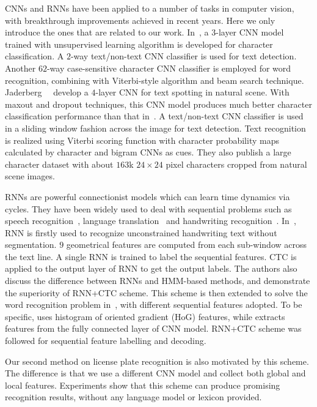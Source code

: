 \documentclass[twocolumn]{svjour3}
\begin{document}
CNNs and RNNs have been applied to a number of tasks in computer vision, with breakthrough improvements achieved in recent years. Here we only introduce the ones that are related to our work. In~\cite{Wang2012}, a $3$-layer CNN model trained with unsupervised learning algorithm is developed for character classification. A $2$-way text/non-text CNN classifier is used for text detection. Another $62$-way case-sensitive character CNN classifier is employed for word recognition, combining with Viterbi-style algorithm and beam search technique.  Jaderberg~\etal~\cite{Max2014ECCV} develop a $4$-layer CNN for text spotting in natural scene. With maxout and dropout techniques, this CNN model produces much better character classification performance than that in~\cite{Wang2012}. A text/non-text CNN classifier is used in a sliding window fashion across the image for text detection. Text recognition is realized using Viterbi scoring function with character probability maps calculated by character and bigram CNNs as cues. They also publish a large character dataset with about $163$k $24 \times 24$ pixel characters cropped from natural scene images.

RNNs are powerful connectionist models which can learn time dynamics via cycles. They have been widely used to deal with sequential problems such as speech recognition~\cite{Graves2006ICML}, language translation~\cite{Sutskever2014} and handwriting recognition~\cite{Graves2009Pami}. In~\cite{Graves2009Pami}, RNN is firstly used to recognize unconstrained handwriting text without segmentation. $9$ geometrical features are computed from each sub-window across the text line. A single RNN is trained to label the sequential features. CTC is applied to the output layer of RNN to get the output labels. The authors also discuss the difference between RNNs and HMM-based methods, and demonstrate the superiority of RNN+CTC scheme. This scheme is then extended to solve the word recognition problem in~\cite{Su2014ACCV,He2015Reading}, with different sequential features adopted. To be specific, \cite{Su2014ACCV} uses histogram of oriented gradient (HoG) features, while \cite{He2015Reading} extracts features from the fully connected layer of CNN model. RNN+CTC scheme was followed for sequential feature labelling and decoding.

Our second method on license plate recognition is also motivated by this scheme. The difference is that we use a different CNN model and collect both global and local features. Experiments show that this scheme can produce promising recognition results, without any language model or lexicon provided.
\end{document}
